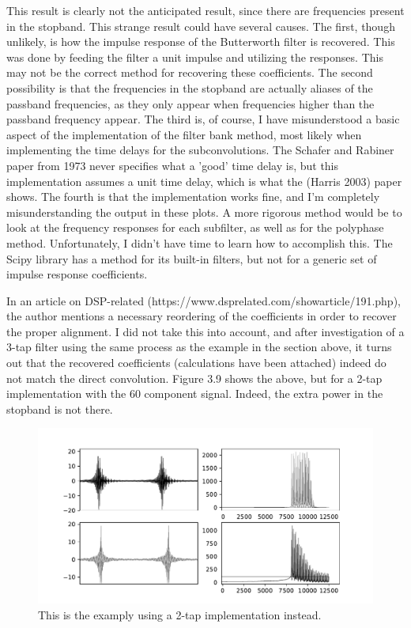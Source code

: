 \documentclass{report}
\begin{document}
This result is clearly not the anticipated result, since there are frequencies present in the stopband.  This strange result could have several causes.  The first, though unlikely, is how the impulse response of the Butterworth filter is recovered.  This was done by feeding the filter a unit impulse and utilizing the responses.  This may not be the correct method for recovering these coefficients.  The second possibility is that the frequencies in the stopband are actually aliases of the passband frequencies, as they only appear when frequencies higher than the passband frequency appear.  The third is, of course, I have misunderstood a basic aspect of the implementation of the filter bank method, most likely when implementing the time delays for the subconvolutions.  The Schafer and Rabiner paper from 1973 never specifies what a 'good' time delay is, but this implementation assumes a unit time delay, which is what the (Harris 2003) paper shows.  The fourth is that the implementation works fine, and I'm completely misunderstanding the output in these plots.  A more rigorous method would be to look at the frequency responses for each subfilter, as well as for the polyphase method.  Unfortunately, I didn't have time to learn how to accomplish this.  The Scipy library has a method for its built-in filters, but not for a generic set of impulse response coefficients.

In an article on DSP-related (https://www.dsprelated.com/showarticle/191.php), the author mentions a necessary reordering of the coefficients in order to recover the proper alignment.  I did not take this into account, and after investigation of a 3-tap filter using the same process as the example in the section above, it turns out that the recovered coefficients (calculations have been attached) indeed do not match the direct convolution.  Figure 3.9 shows the above, but for a 2-tap implementation with the 60 component signal.  Indeed, the extra power in the stopband is not there. 

\begin{figure}[ht]
\includegraphics[scale=.55]{Figure_9.pdf}
\caption{This is the examply using a 2-tap implementation instead.}
\end{figure} 
\end{document}
